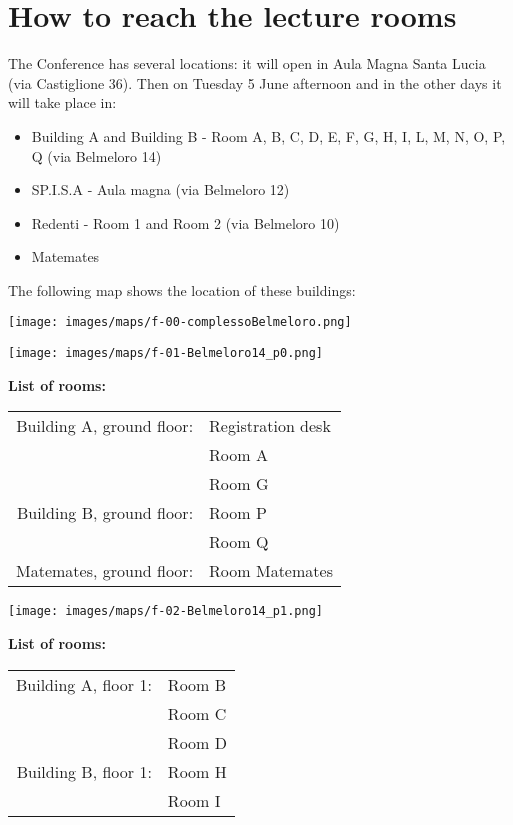 \section*{How to reach the lecture rooms}
The Conference has several locations: it will open in Aula Magna Santa Lucia (via Castiglione 36).
Then on Tuesday 5 June afternoon and in the other days it will take place in:

\bigskip

\begin{itemize}
\item Building A and Building B - Room A, B, C, D, E, F, G, H, I, L, M, N, O, P, Q (via Belmeloro 14)
\item SP.I.S.A - Aula magna (via Belmeloro 12)
\item Redenti - Room 1 and Room 2 (via Belmeloro 10)
\item Matemates
\end{itemize}

\bigskip

\noindent The following map shows the location of these buildings:

\bigskip

\texttt{[image: images/maps/f-00-complessoBelmeloro.png]}

\newpage
\hspace*{-1cm}
\texttt{[image: images/maps/f-01-Belmeloro14\_p0.png]}
\vfill

{\large\textbf{\hfill List of rooms:}\bigskip}

\hfill\colorbox{siamblue!50}{\large
\begin{tabular}{ r l }
Building A, ground floor: & Registration desk \\
                          & Room A \\
                          & Room G \\
Building B, ground floor: & Room P \\
                          & Room Q \\
Matemates, ground floor:  & Room Matemates
\end{tabular}
}

\newpage
\hspace*{-1cm}
\texttt{[image: images/maps/f-02-Belmeloro14\_p1.png]}
\vfill

{\large\textbf{\hfill List of rooms:}\bigskip}

\hfill\colorbox{siamblue!50}{\large
\begin{tabular}{ r l }
  Building A, floor 1: & Room B \\
                       & Room C \\
                       & Room D \\
  Building B, floor 1: & Room H \\
                       & Room I
\end{tabular}
}

